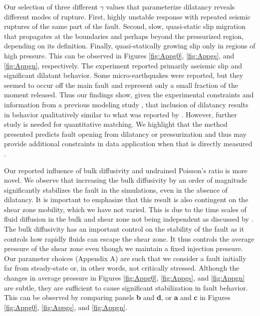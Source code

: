 \documentclass[draft]{agujournal2019}
\begin{document}
Our selection of three different $\gamma$ values that parameterize dilatancy reveals different modes of rupture. First, highly unstable response with repeated seismic ruptures of the same part of the fault. Second, slow, quasi-static slip migration that propagates at the boundaries and perhaps beyond the pressurized region, depending on its definition. Finally, quasi-statically growing slip only in regions of high pressure. This can be observed in Figures \ref{fig:Appg0}, \ref{fig:Appgs}, and \ref{fig:Appgn}, respectively. The  experiment reported primarily aseismic slip and significant dilatant behavior. Some micro-earthquakes were reported, but they seemed to occur off the main fault and represent only a small fraction of the moment released. Thus our findings show, given the experimental constraints and information from a previous modeling study \cite{Larochelle2021}, that inclusion of dilatancy results in behavior qualitatively similar to what was reported by . However, further study is needed for quantitative matching. We highlight that the method presented predicts fault opening from dilatancy or pressurization and thus may provide additional constraints in data application when that is directly measured \cite{Cappa2019}.

Our reported influence of bulk diffusivity and undrained Poisson's ratio is more novel. We observe that increasing the bulk diffusivity by an order of magnitude significantly stabilizes the fault in the simulations, even in the absence of dilatancy. It is important to emphasize that this result is also contingent on the shear zone mobility, which we have not varied. This is due to the time scales of fluid diffusion in the bulk and shear zone not being independent as discussed by . The bulk diffusivity has an important control on the stability of the fault as it controls how rapidly fluids can escape the shear zone. It thus controls the average pressure of the shear zone even though we maintain a fixed injection pressure. Our parameter choices (Appendix A) are such that we consider a fault initially far from steady-state or, in other words, not critically stressed. Although the changes in average pressure in Figures  \ref{fig:Appg0}, \ref{fig:Appgs}, and \ref{fig:Appgn} are subtle, they are sufficient to cause significant stabilization in fault behavior. This can be observed by comparing panels {\bf b} and {\bf d}, or {\bf a} and {\bf c} in Figures \ref{fig:Appg0}, \ref{fig:Appgs}, and \ref{fig:Appgn}. 
\end{document}

